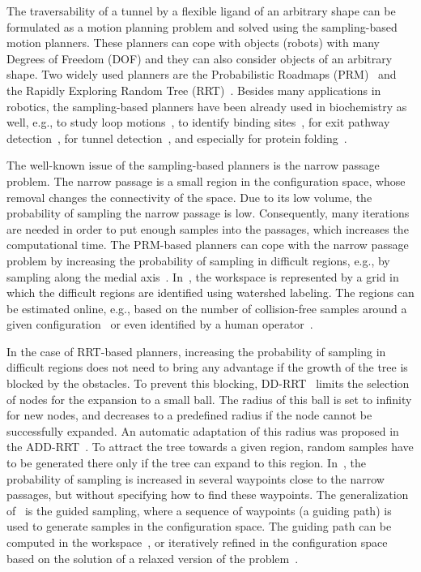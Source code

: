 \documentclass{bmcart}
\begin{document}
The traversability of a tunnel by a flexible ligand of an arbitrary shape can be formulated as a motion planning problem and solved using the sampling-based motion planners.
These planners can cope with objects (robots) with many Degrees of Freedom (DOF) and they can also consider objects of an arbitrary shape.
Two widely used planners are the Probabilistic Roadmaps (PRM)~\cite{kavrakiForPP} and the Rapidly Exploring Random Tree (RRT)~\cite{lavalleRRT}.
Besides many applications in robotics, the sampling-based planners have been already used in biochemistry as well, e.g., to study loop motions~\cite{cortes2004geometric}, to identify binding sites~\cite{bayazit2001ligand}, for exit pathway detection~\cite{cortes2010simulating,cortes2005path}, for tunnel detection~\cite{vonasek2017tunnel}, and especially for protein folding~\cite{raveh2009rapid,amato2002using}. %


The well-known issue of the sampling-based planners is the narrow passage problem.
The narrow passage is a small region in the configuration space, whose removal changes the connectivity of the space.
Due to its low volume, the probability of sampling the narrow passage is low.
Consequently, many iterations are needed in order to put enough samples into the passages, which increases the computational time.
The PRM-based planners can cope with the narrow passage problem by increasing the probability of sampling in difficult regions, e.g., by sampling along the medial axis~\cite{wilmarthMAPRM}.
In~\cite{bergWIG}, the workspace is represented by a grid in which the difficult regions are identified using watershed labeling.
The regions can be estimated online, e.g., based on the number of collision-free samples around a given configuration~\cite{overmarsGauss,hsuBridge} or even identified by a human operator~\cite{denny2018general}. 

In the case of RRT-based planners, increasing the probability of sampling in difficult regions does not need to bring any advantage
if the growth of the tree is blocked by the obstacles.
To prevent this blocking, DD-RRT~\cite{yershovaDDRRT} limits the selection of nodes for the expansion to a small ball. 
The radius of this ball is set to infinity for new nodes, and decreases to a predefined radius if the node cannot be successfully expanded.
An automatic adaptation of this radius was proposed in the ADD-RRT~\cite{jailletADRRT}.
To attract the tree towards a given region, random samples have to be generated there only if the tree can expand to this region.
In~\cite{kardossRRTKK}, the probability of sampling is increased in several waypoints close to the narrow passages, but without specifying how to find these waypoints.
The generalization of~\cite{kardossRRTKK} is the guided sampling, where a sequence of waypoints (a guiding path) is used to generate samples in the configuration space.
The guiding path can be computed in the workspace~\cite{vonasek2009rrt}, or iteratively refined in the configuration space based on the solution of a relaxed version of the problem~\cite{bayazitIRC}.
\end{document}
